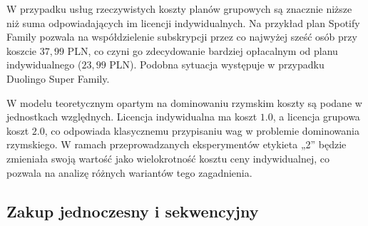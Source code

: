 W przypadku usług rzeczywistych koszty planów grupowych są znacznie niższe niż suma odpowiadających im licencji indywidualnych. Na przykład plan Spotify Family pozwala na współdzielenie subskrypcji przez co najwyżej sześć osób przy koszcie $37{,}99$ PLN, co czyni go zdecydowanie bardziej opłacalnym od planu indywidualnego ($23{,}99$ PLN). Podobna sytuacja występuje w przypadku Duolingo Super Family.

W modelu teoretycznym opartym na dominowaniu rzymskim koszty są podane w jednostkach względnych. Licencja indywidualna ma koszt $1.0$, a licencja grupowa koszt $2.0$, co odpowiada klasycznemu przypisaniu wag w problemie dominowania rzymskiego. W ramach przeprowadzanych eksperymentów etykieta „2” będzie zmieniała swoją wartość jako wielokrotność kosztu ceny indywidualnej, co pozwala na analizę różnych wariantów tego zagadnienia.






\subsection{Zakup jednoczesny i sekwencyjny}

